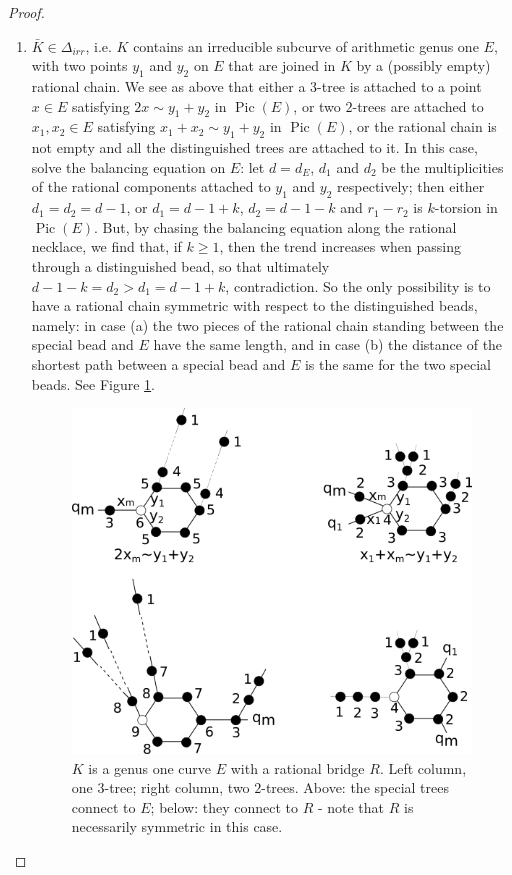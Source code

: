 \documentclass[11pt]{amsart}
\newcommand{\Pic}{\operatorname{Pic}}
\theoremstyle{plain}
\theoremstyle{definition}
\begin{document}
\begin{proof}
\begin{enumerate}[leftmargin=.6cm]
 \item\label{KinDirr} $\bar K\in\Delta_{irr}$, i.e. $K$ contains an irreducible subcurve of arithmetic genus one $E$, with two points $y_1$ and $y_2$ on $E$ that are joined in $K$ by a (possibly empty) rational chain. We see as above that either a $3$-tree is attached to a point $x\in E$ satisfying $2x\sim y_1+y_2$ in $\Pic(E)$, or two $2$-trees are attached to $x_1,x_2\in E$ satisfying $x_1+x_2\sim y_1+y_2$ in $\Pic(E)$, or the rational chain is not empty and all the distinguished trees are attached to it. In this case, solve the balancing equation on $E$: let $d=d_E$, $d_1$ and $d_2$ be the multiplicities of the rational components attached to $y_1$ and $y_2$ respectively; then either $d_1=d_2=d-1$, or $d_1=d-1+k$, $d_2=d-1-k$ and $r_1-r_2$ is $k$-torsion in $\Pic(E)$. But, by chasing the balancing equation along the rational necklace, we find that, if $k\geq 1$, then the trend increases when passing through a distinguished bead, so that ultimately $d-1-k=d_2>d_1=d-1+k$, contradiction. So the only possibility is to have a rational chain symmetric with respect to the distinguished beads, namely: in case (a) the two pieces of the rational chain standing between the special bead and $E$ have the same length, and in case (b) the distance of the shortest path between a special bead and $E$ is the same for the two special beads. See Figure \ref{fig:ER}.
 
  \begin{figure}[h]
 \includegraphics[width=.8\textwidth]{ERexample}
 \caption{$K$ is a genus one curve $E$ with a rational bridge $R$. Left column, one $3$-tree; right column, two $2$-trees. Above: the special trees connect to $E$; below: they connect to $R$ - note that $R$ is necessarily symmetric in this case.}\label{fig:ER}
  \end{figure}
 

\end{enumerate}
\end{proof}
\end{document}

